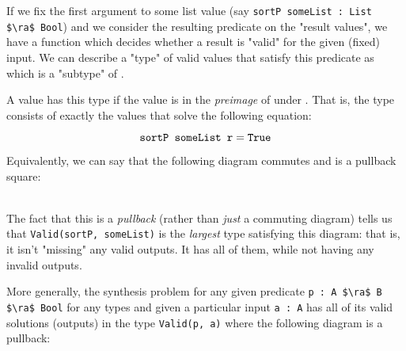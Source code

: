 \documentclass[10pt]{article}
\begin{document}
If we fix the first argument to some list value (say \lstinline{sortP someList : List $\ra$ Bool}) and we consider the resulting predicate on the "result values", we have
a function which decides whether a result is "valid" for the given (fixed) input. We can describe a "type" of valid values that satisfy this predicate
as  which is a "subtype" of .

A value has this type if the value is in the \textit{preimage} of  under . That is, the type 
consists of exactly the values  that solve the following equation:

\begin{equation*}
  \texttt{sortP someList r} = \texttt{True}
\end{equation*}

%

\noindent
Equivalently, we can say that the following diagram commutes and is a pullback square:
\\

\\

\noindent
The fact that this is a \textit{pullback} (rather than \textit{just} a commuting diagram) tells us that \lstinline{Valid(sortP, someList)} is the
\textit{largest} type satisfying this diagram: that is, it isn't "missing" any valid outputs. It has all of them, while not having any invalid outputs.

More generally, the synthesis problem for any given predicate \lstinline{p : A $\ra$ B $\ra$ Bool} for any types  and  given a particular
input \lstinline{a : A} has all of its valid solutions (outputs) in the type \lstinline{Valid(p, a)} where the following diagram is a pullback:
\\

\\
\end{document}

